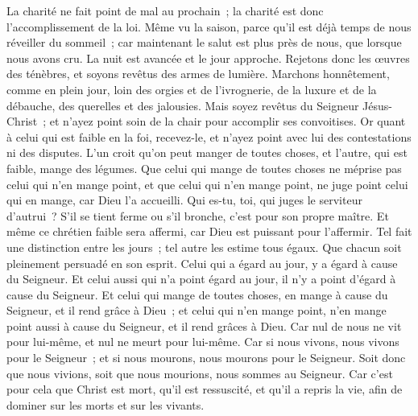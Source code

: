 \begin{multicols}{2}
La charité ne fait point de mal au prochain~; la charité est donc l'accomplissement de la loi.
Même vu la saison, parce qu'il est déjà temps de nous réveiller du sommeil~; car maintenant le salut est plus près de nous, que lorsque nous avons cru.
La nuit est avancée et le jour approche. Rejetons donc les œuvres des ténèbres, et soyons revêtus des armes de lumière.
Marchons honnêtement, comme en plein jour, loin des orgies et de l'ivrognerie, de la luxure et de la débauche, des querelles et des jalousies.
Mais soyez revêtus du Seigneur Jésus-Christ~; et n'ayez point soin de la chair pour accomplir ses convoitises.
\VerseOne{}Or quant à celui qui est faible en la foi, recevez-le, et n'ayez point avec lui des contestations ni des disputes.
L'un croit qu'on peut manger de toutes choses, et l'autre, qui est faible, mange des légumes.
Que celui qui mange de toutes choses ne méprise pas celui qui n'en mange point, et que celui qui n'en mange point, ne juge point celui qui en mange, car Dieu l'a accueilli.
Qui es-tu, toi, qui juges le serviteur d'autrui~? S'il se tient ferme ou s'il bronche, c'est pour son propre maître. Et même ce chrétien faible sera affermi, car Dieu est puissant pour l'affermir.
Tel fait une distinction entre les jours~; tel autre les estime tous égaux. Que chacun soit pleinement persuadé en son esprit.
Celui qui a égard au jour, y a égard à cause du Seigneur. Et celui aussi qui n'a point égard au jour, il n'y a point d'égard à cause du Seigneur. Et celui qui mange de toutes choses, en mange à cause du Seigneur, et il rend grâce à Dieu~; et celui qui n'en mange point, n'en mange point aussi à cause du Seigneur, et il rend grâces à Dieu.
Car nul de nous ne vit pour lui-même, et nul ne meurt pour lui-même.
Car si nous vivons, nous vivons pour le Seigneur~; et si nous mourons, nous mourons pour le Seigneur. Soit donc que nous vivions, soit que nous mourions, nous sommes au Seigneur.
Car c'est pour cela que Christ est mort, qu'il est ressuscité, et qu'il a repris la vie, afin de dominer sur les morts et sur les vivants.

\end{multicols}
